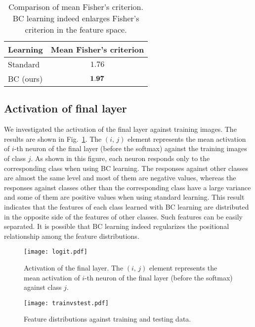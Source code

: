 \documentclass[10pt,twocolumn,letterpaper]{article}
\begin{document}
\begin{table}[h]
	\centering
	\caption{Comparison of mean Fisher's criterion. BC learning indeed enlarges Fisher's criterion in the feature space.}
	\label{tab:fisher}
	\vspace{2mm}
	\small
	\begin{tabular}{lc}
		\toprule
		Learning & Mean Fisher's criterion \\
		\midrule
		Standard & $1.76$ \\
		BC (ours) & ${\bf 1.97}$ \\
		\bottomrule
	\end{tabular}
	\vspace{-2mm}
\end{table}


\subsection{Activation of final layer}
We investigated the activation of the final layer against training images. The results are shown in Fig.~\ref{fig:logit}. The $(i,\,j)$ element represents the mean activation of $i$-th neuron of the final layer (before the softmax) against the training images of class $j$. As shown in this figure, each neuron responds only to the corresponding class when using BC learning. The responses against other classes are almost the same level and most of them are negative values, whereas the responses against classes other than the corresponding class have a large variance and some of them are positive values when using standard learning. This result indicates that the features of each class learned with BC learning are distributed in the opposite side of the features of other classes. Such features can be easily separated. It is possible that BC learning indeed regularizes the positional relationship among the feature distributions. 

\begin{figure}
	\centering
	\texttt{[image: logit.pdf]}
	\vspace{-3mm}
	\caption{Activation of the final layer. The $(i,\,j)$ element represents the mean activation of $i$-th neuron of the final layer (before the softmax) against class $j$.}
	\label{fig:logit}
	\vspace{-2mm}
\end{figure}

\begin{figure}
	\centering
	\texttt{[image: trainvstest.pdf]}
	\vspace{-3mm}
	\caption{Feature distributions against training and testing data.}
	\label{fig:trainvstest}
	\vspace{-3mm}
\end{figure}
\end{document}
